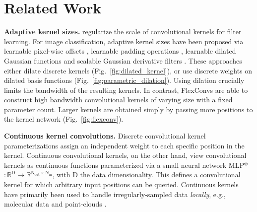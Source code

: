 \documentclass{article} \usepackage{iclr2022_conference,times}
\def\sR{{\mathbb{R}}}
\def\sR{{\mathbb{R}}}
\def\bpsi{{\boldsymbol{\psi}}}
\newcommand{\mlp}{{\btt MLP}}
\newcommand{\mlppsi}{\mlp$^{\bpsi}$}
\begin{document}
\section{Related Work}
\vspace{-2mm}
\textbf{Adaptive kernel sizes.} \citet{loog2017supervised} regularize the scale of convolutional kernels for filter learning. For image classification, adaptive kernel sizes have been proposed via learnable pixel-wise offsets \citep{dai2017deformable}, learnable padding operations \citep{Han_2018_CVPR}, learnable dilated Gaussian functions \citep{Shelhamer2019BlurringTL, Xiong_2020_CVPR, tabernik2020spatially, nguyen2020robust} and scalable Gaussian derivative filters \citep{pintea2021resolution, tomen2021deep, lindeberg2021scale}.
These approaches either dilate discrete kernels (Fig.~\ref{fig:dilated_kernel}), or use discrete weights on dilated basis functions (Fig.~\ref{fig:parametric_dilation}). Using dilation crucially limits the bandwidth of the resulting kernels. In contrast, FlexConvs are able to construct high bandwidth convolutional kernels of varying size with a fixed parameter count. 
Larger kernels are obtained simply by passing more positions to the kernel network (Fig.~\ref{fig:flexconv}). 

\textbf{Continuous kernel convolutions.} Discrete convolutional kernel parameterizations assign an independent weight to each specific position in the kernel. Continuous convolutional kernels, on the other hand, view convolutional kernels as continuous functions parameterized via a small neural network \mlppsi$: \sR^{\mathrm{D}} \rightarrow \sR^{\mathrm{N}_{\mathrm{out}} \times \mathrm{N}_{\mathrm{in}}}$, with $\mathrm{D}$ the data dimensionality. This defines a convolutional kernel for which arbitrary input positions can be queried. Continuous kernels have primarily been used to handle irregularly-sampled data \textit{locally}, e.g., molecular data \citep{simonovsky2017dynamic, schutt2017schnet} and point-clouds \citep{thomas2018tensor, wang2018deep, shi2019points}. 
\end{document}

